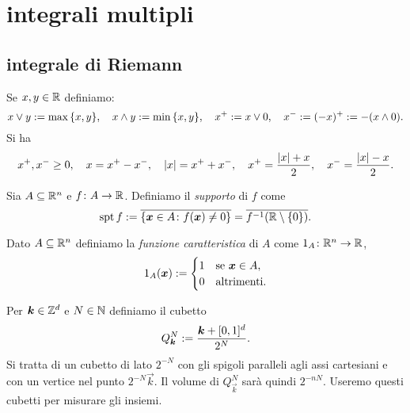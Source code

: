 \chapter{integrali multipli}

\section{integrale di Riemann}
Se $x,y\in {\mathbb R}$ definiamo:
\[
    x \vee y := \max{\left\{ x,y \right\}},
    \quad
    x \wedge y := \min{\left\{ x,y \right\}},
    \quad
    x^+ := x \vee 0,
    \quad
    x^- := (-x)^+ := -(x\wedge 0).
\]
Si ha
\[
    x^+,x^-\ge 0,
    \quad
    x = x^+ - x^-,
    \quad 
    {\left|x\right|} = x^+ + x^-,
    \quad
    x^+ = \frac{{\left|x\right|}+x}{2},
    \quad
    x^- = \frac{{\left|x\right|}-x}{2}.
\]

Sia $A\subseteq {\mathbb R}^n$ e $f\colon A \to {\mathbb R}$. 
Definiamo il \emph{supporto} di $f$ come 
\[
 \operatorname{spt} f 
    := \overline{{\left\{ \boldsymbol x \in A \colon f(\boldsymbol x) \neq 0 \right\}}}
    = \overline{f^{-1}({\mathbb R}\setminus{\left\{ 0 \right\}})}.
\]

Dato $A\subseteq {\mathbb R}^n$ definiamo la \emph{funzione caratteristica}
di $A$ come $1_A\colon {\mathbb R}^n \to {\mathbb R}$,
\[
  1_A(\boldsymbol x) := \begin{cases}
    1 & \text{se $\boldsymbol x \in A$,}\\
    0 & \text{altrimenti.}
  \end{cases}
\]

Per $\boldsymbol k \in {\mathbb Z}^d$ e $N\in {\mathbb N}$ definiamo 
il cubetto 
\[
  Q^N_{\boldsymbol k} := \frac{\boldsymbol k + [0,1]^d}{2^N}.
\]
Si tratta di un cubetto di lato $2^{-N}$ con gli spigoli paralleli 
agli assi cartesiani e con un vertice nel punto $2^{-N} \vec k$.
Il volume di $Q^N_{\vec k}$ sarà quindi $2^{-nN}$.
Useremo questi cubetti per misurare gli insiemi.

